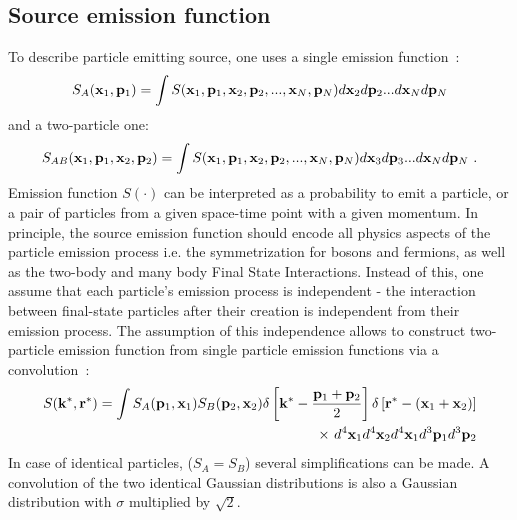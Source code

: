     \subsection{Source emission function}
      To describe particle emitting source, one uses a single emission function~\cite{nonidfemto}:
      \begin{equation}
        \label{eq:source-single-3d}
        S_A(\mathbf{x}_1,\mathbf{p}_1) = \int S(\mathbf{x}_1,\mathbf{p}_1,\mathbf{x}_2,\mathbf{p}_2,...,\mathbf{x}_N,\mathbf{p}_N)
        d \mathbf{x}_2 d \mathbf{p}_2 ... d \mathbf{x}_N d \mathbf{p}_N
      \end{equation}
      and a two-particle one:
      \begin{equation}
        \label{eq:source-two-3d}
        S_{AB}(\mathbf{x}_1,\mathbf{p}_1,\mathbf{x}_2,\mathbf{p}_2) = \int S(\mathbf{x}_1,\mathbf{p}_1,\mathbf{x}_2,\mathbf{p}_2,...,\mathbf{x}_N,\mathbf{p}_N)
        d \mathbf{x}_3 d \mathbf{p}_3 ... d \mathbf{x}_N d \mathbf{p}_N~.
      \end{equation}
      Emission function $S(\cdot)$ can be interpreted as a probability to emit a particle, or a pair of particles from a given space-time point with a given momentum.
      In principle, the source emission function should encode all physics aspects of the particle emission process i.e. the symmetrization for bosons and fermions, as well as the two-body and many body Final State Interactions.
      Instead of this, one assume that each particle's emission process is independent - the interaction between final-state particles after their creation is independent from their emission process.
      The assumption of this independence allows to construct two-particle emission function from single particle emission functions via a convolution~\cite{nonidfemto}:
      \begin{equation}
        \label{eq:source-two-conv}
        \begin{split}
          S(\mathbf{k}^{*},\mathbf{r}^{*}) = \int S_A ( \mathbf{p}_1, \mathbf{x}_1 ) S_B ( \mathbf{p}_2, \mathbf{x}_2 )
          \delta \left[\mathbf{k}^{*} - \frac{\mathbf{p}_1+\mathbf{p}_2}{2} \right]
          \delta \left[\mathbf{r}^{*} - (\mathbf{x}_1+\mathbf{x}_2) \right] \\
          \times~d^4 \mathbf{x}_1 d^4 \mathbf{x}_2 d^4 \mathbf{x}_1 d^3 \mathbf{p}_1 d^3 \mathbf{p}_2
        \end{split}
      \end{equation}
      In case of identical particles, ($S_A = S_B$) several simplifications can be made.
      A convolution of the two identical Gaussian distributions is also a Gaussian distribution with $\sigma$ multiplied by $\sqrt{2}$.
